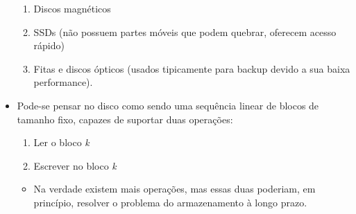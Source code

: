 \documentclass[10pt]{article}
\begin{document}
\begin{itemize}
    \begin{enumerate}
        \item Discos magnéticos
        \item SSDs (não possuem partes móveis que podem quebrar, oferecem acesso rápido)
        \item Fitas e discos ópticos (usados tipicamente para backup devido a sua baixa
        performance).
    \end{enumerate}
    \item Pode-se pensar no disco como sendo uma sequência linear de blocos de tamanho
    fixo, capazes de suportar duas operações:
    \begin{enumerate}
        \item Ler o bloco \textit{k}
        \item Escrever no bloco \textit{k}
    \end{enumerate}
    \begin{itemize}
        \item Na verdade existem mais operações, mas essas duas poderiam, em princípio,
        resolver o problema do armazenamento à longo prazo.
    \end{itemize}
\end{itemize}
\end{document}
